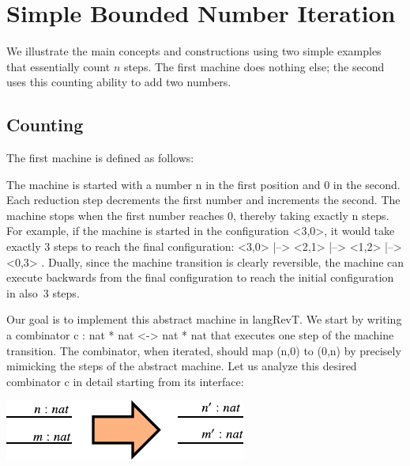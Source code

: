 \documentclass{llncs}
\begin{document}
\section{Simple Bounded Number Iteration}
\label{sec:bounded}

We illustrate the main concepts and constructions using two simple
examples that essentially count $n$ steps. The first machine does
nothing else; the second uses this counting ability to add two
numbers.

\subsection{Counting}

The first machine is defined as follows:

\vspace{-15pt}
\begin{multicols}{2}

\end{multicols}
\vspace{-15pt}
  
\noindent The machine is started with a number {{n}} in the first position
and {{0}} in the second. Each reduction step decrements the first number and
increments the second. The machine stops when the first number reaches 0,
thereby taking exactly {{n}} steps. For example, if the machine is started in
the configuration {{<3,0>}}, it would take exactly 3 steps to reach the final
configuration: {{ <3,0> |--> <2,1> |--> <1,2> |--> <0,3> }}. Dually, since
the machine transition is clearly reversible, the machine can execute
backwards from the final configuration to reach the initial configuration in
also~3 steps. 

Our goal is to implement this abstract machine in {{langRevT}}. We start by
writing a combinator {{c : nat * nat <-> nat * nat}} that executes one step
of the machine transition. 
The combinator, when iterated, should map {{(n,0)}} to
{{(0,n)}} by precisely mimicking the steps of the abstract machine. Let us
analyze this desired combinator {{c}} in detail starting from its interface:

\begin{center}
  \includegraphics{diagrams/nat-nat1.pdf}
\end{center}
\end{document}
